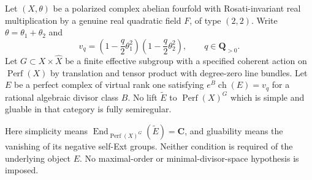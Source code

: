 \begin{theorem}
\label{thm:semireg-rm-rank-one-equivariant}
Let $(X,\theta)$ be a polarized complex abelian fourfold
with Rosati-invariant real multiplication by a genuine
real quadratic field $F$, of type $(2,2)$. Write
$\theta=\theta_1+\theta_2$ and
\[
 v_q=\left(1-\frac q2\theta_1^2\right)
       \left(1-\frac q2\theta_2^2\right),\qquad q\in\mathbf Q_{>0}.
 \tag{S34.1}
\]
Let $G\subset X\times\widehat X$ be a finite effective
subgroup with a specified coherent action on
$\operatorname{Perf}(X)$ by translation and tensor product
with degree-zero line bundles. Let $E$ be a perfect complex
of virtual rank one satisfying
$e^B\operatorname{ch}(E)=v_q$ for a rational algebraic
divisor class $B$. No lift $\widetilde E$ to
$\operatorname{Perf}(X)^G$ which is simple and gluable
in that category is fully semiregular.

Here simplicity means
$\operatorname{End}_{\operatorname{Perf}(X)^G}
(\widetilde E)=\mathbf C$, and gluability means the
vanishing of its negative self-Ext groups. Neither condition
is required of the underlying object $E$. No maximal-order
or minimal-divisor-space hypothesis is imposed.
\end{theorem}
